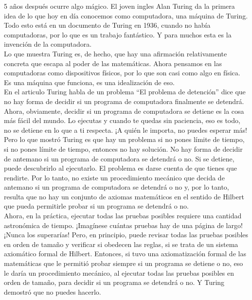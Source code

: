 \documentclass{article}
\begin{document}
\vspace{2mm}

5 años después ocurre algo mágico. El joven ingles Alan Turing da la primera idea de lo que hoy en día conocemos como computadora, una máquina de Turing. Todo esto está en un documento de Turing en 1936, cuando no había computadoras, por lo que es un trabajo fantástico. Y para muchos esta es la invención de la computadora.\\
Lo que muestra Turing es, de hecho, que hay una afirmación relativamente concreta que escapa al poder de las matemáticas. Ahora pensamos en las computadoras como dispositivos físicos, por lo que son casi como algo en física. Es una máquina que funciona, es una idealización de eso.\\
En el articulo Turing habla de un problema “El problema de detención” dice que no hay forma de decidir si un programa de computadora finalmente se detendrá. Ahora, obviamente, decidir si un programa de computadora se detiene es la cosa más fácil del mundo. Lo ejecutas y cuando te quedas sin paciencia, eso es todo, no se detiene en lo que a ti respecta. ¡A quién le importa, no puedes esperar más! Pero lo que mostró Turing es que hay un problema si no pones límite de tiempo, si no pones límite de tiempo, entonces no hay solución. No hay forma de decidir de antemano si un programa de computadora se detendrá o no. Si se detiene, puede descubrirlo al ejecutarlo. El problema es darse cuenta de que tienes que rendirte. Por lo tanto, no existe un procedimiento mecánico que decida de antemano si un programa de computadora se detendrá o no y, por lo tanto, resulta que no hay un conjunto de axiomas matemáticos en el sentido de Hilbert que pueda permitirle probar si un programa se detendrá o no.\\
Ahora, en la práctica, ejecutar todas las pruebas posibles requiere una cantidad astronómica de tiempo. ¡Imagínese cuántas pruebas hay de una página de largo! ¡Nunca los superarías! Pero, en principio, puede revisar todas las pruebas posibles en orden de tamaño y verificar si obedecen las reglas, si se trata de un sistema axiomático formal de Hilbert. Entonces, si tuvo una axiomatización formal de las matemáticas que le permitió probar siempre si un programa se detiene o no, eso le daría un procedimiento mecánico, al ejecutar todas las pruebas posibles en orden de tamaño, para decidir si un programa se detendrá o no. Y Turing demostró que no puedes hacerlo. 

\vspace{2mm}
\end{document}
